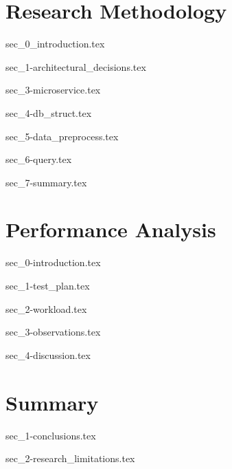 \documentclass[a4paper,oneside,12pt]{report}
\begin{document}
\chapter{Research Methodology}
\label{ch:method}

{sec_0_introduction.tex}

{sec_1-architectural_decisions.tex}

{sec_3-microservice.tex}

{sec_4-db_struct.tex}

{sec_5-data_preprocess.tex}

{sec_6-query.tex}

{sec_7-summary.tex}

\chapter{Performance Analysis}
\label{ch:results}

{sec_0-introduction.tex}

{sec_1-test_plan.tex}

{sec_2-workload.tex}

{sec_3-observations.tex}

{sec_4-discussion.tex}

\chapter{Summary}
\label{ch:summary}

{sec_1-conclusions.tex}

{sec_2-research_limitations.tex}


\graphicspath{ {./images/} }

% 
% 
\printbibliography[title={References}]
\end{document}

